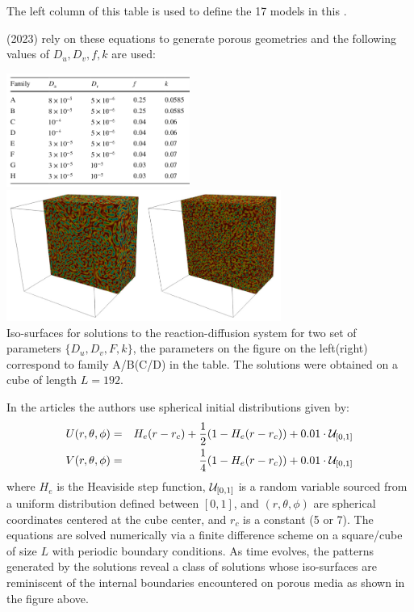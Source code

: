The left column of this table is used to define the 17 
models in this \stone.

\textcite{gama23} (2023) rely on these equations to generate porous geometries 
and the following values of $D_u,D_v,f,k$ are used:

\begin{center}
\includegraphics[width=6cm]{python_codes/fieldstone_171/images/gama01}
\includegraphics[width=9cm]{python_codes/fieldstone_171/images/gama02}\\
{\captionfont Iso-surfaces for solutions to the reaction-diffusion system 
for two set of parameters $\{D_u,D_v,F,k\}$, the parameters on the figure on 
the left(right) correspond to family A/B(C/D) in the table. The solutions were
obtained on a cube of length $L=192$.}
\end{center}

In the articles the authors use spherical initial distributions given by:
\begin{eqnarray}
U(r,\theta,\phi) &=& H_e(r-r_c) +\frac12 (1-H_e(r-r_c)) + 0.01 \cdot {\cal U}_{[0,1]} \nonumber\\
V(r,\theta,\phi) &=& \frac14 (1-H_e(r-r_c)) + 0.01 \cdot {\cal U}_{[0,1]}
\end{eqnarray}
where $H_e$ is the Heaviside step function, ${\cal U}_{[0,1]}$ is a random variable sourced from a 
uniform distribution defined between $[0,1]$, and $(r,\theta,\phi)$ are spherical coordinates centered at
the cube center, and $r_c$ is a constant (5 or 7).
The equations are solved numerically via a finite difference scheme on a square/cube of size $L$
with periodic boundary conditions. As time evolves, the patterns generated by
the solutions reveal a class of solutions whose iso-surfaces are reminiscent of the internal
boundaries encountered on porous media as shown in the figure above.

